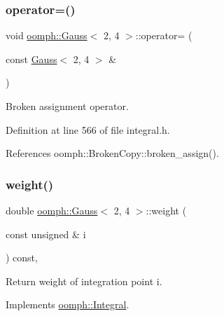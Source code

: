 \mbox{\label{classoomph_1_1Gauss_3_012_00_014_01_4_acd1f3f2c4eed8ec845b223b56d9d3b23}} 
\subsubsection{\texorpdfstring{operator=()}{operator=()}}
{\footnotesize\ttfamily void \hyperlink{classoomph_1_1Gauss}{oomph\+::\+Gauss}$<$ 2, 4 $>$\+::operator= (\begin{DoxyParamCaption}\item[{const \hyperlink{classoomph_1_1Gauss}{Gauss}$<$ 2, 4 $>$ \&}]{ }\end{DoxyParamCaption})\hspace{0.3cm}{\ttfamily [inline]}}



Broken assignment operator. 



Definition at line 566 of file integral.\+h.



References oomph\+::\+Broken\+Copy\+::broken\+\_\+assign().

\mbox{\label{classoomph_1_1Gauss_3_012_00_014_01_4_a8c3303b3c3d2eb223460b12b6dc2cbe7}} 
\subsubsection{\texorpdfstring{weight()}{weight()}}
{\footnotesize\ttfamily double \hyperlink{classoomph_1_1Gauss}{oomph\+::\+Gauss}$<$ 2, 4 $>$\+::weight (\begin{DoxyParamCaption}\item[{const unsigned \&}]{i }\end{DoxyParamCaption}) const\hspace{0.3cm}{\ttfamily [inline]}, {\ttfamily [virtual]}}



Return weight of integration point i. 



Implements \hyperlink{classoomph_1_1Integral_ac65335e2aab120b285b3d6c294507b06}{oomph\+::\+Integral}.



